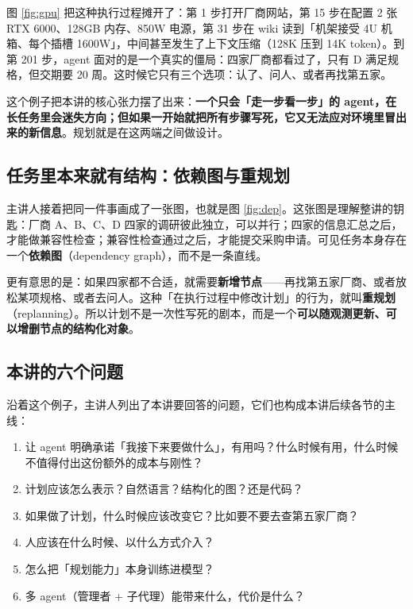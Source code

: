 \documentclass[a4paper]{article}
\begin{document}
图 \ref{fig:gpu} 把这种执行过程摊开了：第 1 步打开厂商网站，第 15 步在配置 2 张 RTX 6000、128GB 内存、850W 电源，第 31 步在 wiki 读到「机架接受 4U 机箱、每个插槽 1600W」，中间甚至发生了上下文压缩（128K 压到 14K token）。到第 201 步，agent 面对的是一个真实的僵局：四家厂商都看过了，只有 D 满足规格，但交期要 20 周。这时候它只有三个选项：认了、问人、或者再找第五家。

这个例子把本讲的核心张力摆了出来：\textbf{一个只会「走一步看一步」的 agent，在长任务里会迷失方向；但如果一开始就把所有步骤写死，它又无法应对环境里冒出来的新信息}。规划就是在这两端之间做设计。

\subsection{任务里本来就有结构：依赖图与重规划}

主讲人接着把同一件事画成了一张图，也就是图 \ref{fig:dep}。这张图是理解整讲的钥匙：厂商 A、B、C、D 四家的调研彼此独立，可以并行；四家的信息汇总之后，才能做兼容性检查；兼容性检查通过之后，才能提交采购申请。可见任务本身存在一个\textbf{依赖图}（dependency graph），而不是一条直线。

更有意思的是：如果四家都不合适，就需要\textbf{新增节点}——再找第五家厂商、或者放松某项规格、或者去问人。这种「在执行过程中修改计划」的行为，就叫\textbf{重规划}（replanning）。所以计划不是一次性写死的剧本，而是一个\textbf{可以随观测更新、可以增删节点的结构化对象}。

\subsection{本讲的六个问题}

沿着这个例子，主讲人列出了本讲要回答的问题，它们也构成本讲后续各节的主线：

\begin{enumerate}
\item 让 agent 明确承诺「我接下来要做什么」，有用吗？什么时候有用，什么时候不值得付出这份额外的成本与刚性？
\item 计划应该怎么表示？自然语言？结构化的图？还是代码？
\item 如果做了计划，什么时候应该改变它？比如要不要去查第五家厂商？
\item 人应该在什么时候、以什么方式介入？
\item 怎么把「规划能力」本身训练进模型？
\item 多 agent（管理者 + 子代理）能带来什么，代价是什么？
\end{enumerate}
\end{document}
